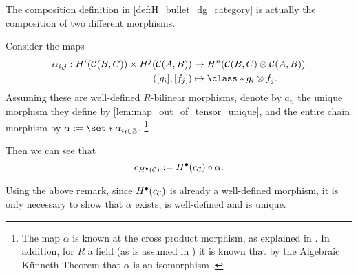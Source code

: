 \begin{remark}
    \label{rem:H_bullet_composition_alpha}
    The composition definition in \autoref{def:H_bullet_dg_category} is actually the composition of two different morphisms.

    Consider the maps
    \begin{align*}
        \alpha_{i, j}: H^i(\Cc(B, C)) \times H^j(\Cc(A, B)) &\to H^n(\Cc(B, C) \otimes \Cc(A, B)) \\
        ([g_i], [f_j]) &\mapsto \class*{g_i \otimes f_j}.
    \end{align*}
    Assuming these are well-defined \( R \)-bilinear morphisms, denote by \( a_n \) the unique morphism they define by \autoref{lem:map_out_of_tensor_unique}, and the entire chain morphism by \( \alpha := \set*{\alpha_i}_{i \in \Zb} \). \footnote{
        The map \( \alpha \) is known at the cross product morphism, as explained in \cite[p. 273]{Hatcher_2002}. In addition, for \( R \) a field (as is assumed in \cite{Jasso-Muro_2023}) it is known that by the Algebraic Künneth Theorem that \( \alpha \) is an isomorphism \cite[Theorem 3B.5]{Hatcher_2002}.
    }
    
    Then we can see that
    \[
        c_{H^\bullet({\mathcal{C}})} := H^\bullet(c_{{\mathcal{C}}}) \circ \alpha.
    \] 
\end{remark}

Using the above remark, since \( H^{\bullet}(c_{{\mathcal{C}}}) \) is already a well-defined morphism, it is only necessary to show that \( \alpha \) exists, is well-defined and is unique.

